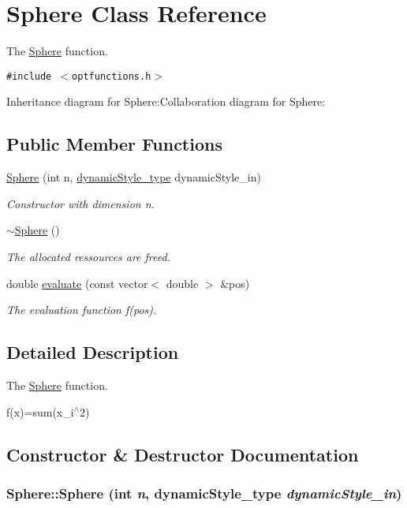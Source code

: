 \hypertarget{classSphere}{
\section{Sphere Class Reference}
\label{classSphere}
}
The \hyperlink{classSphere}{Sphere} function.  


{\tt \#include $<$optfunctions.h$>$}

Inheritance diagram for Sphere:Collaboration diagram for Sphere:\subsection*{Public Member Functions}
\begin{CompactItemize}
\item 
\hyperlink{classSphere_e32a671e7ef975a8cfb6ad59a53a3d33}{Sphere} (int n, \hyperlink{optfunctions_8h_ae9aa3a5dd199a43e77abc2cccf4477e}{dynamicStyle\_\-type} dynamicStyle\_\-in)
\begin{CompactList}\small\item\em Constructor with dimension n. \item\end{CompactList}\item 
\hyperlink{classSphere_569c071e50a3e11f678630ee1a17737e}{$\sim$Sphere} ()
\begin{CompactList}\small\item\em The allocated ressources are freed. \item\end{CompactList}\item 
double \hyperlink{classSphere_e4d2bfab43d39524dfe3421d76d66f5f}{evaluate} (const vector$<$ double $>$ \&pos)
\begin{CompactList}\small\item\em The evaluation function f(pos). \item\end{CompactList}\end{CompactItemize}


\subsection{Detailed Description}
The \hyperlink{classSphere}{Sphere} function. 

f(x)=sum(x\_\-i$^\wedge$2) 

\subsection{Constructor \& Destructor Documentation}
\hypertarget{classSphere_e32a671e7ef975a8cfb6ad59a53a3d33}{
\subsubsection{\setlength{\rightskip}{0pt plus 5cm}Sphere::Sphere (int {\em n}, \/  {\bf dynamicStyle\_\-type} {\em dynamicStyle\_\-in})}}
\label{classSphere_e32a671e7ef975a8cfb6ad59a53a3d33}


